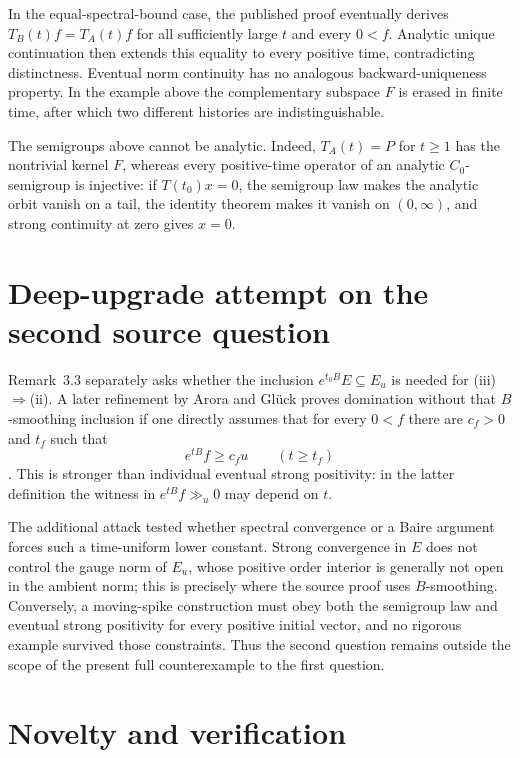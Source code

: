 \documentclass[11pt]{article}
\begin{document}
In the equal-spectral-bound case, the published proof eventually derives
$T_B(t)f=T_A(t)f$ for all sufficiently large $t$ and every $0<f$.  Analytic
unique continuation then extends this equality to every positive time,
contradicting distinctness.  Eventual norm continuity has no analogous
backward-uniqueness property.  In the example above the complementary
subspace $F$ is erased in finite time, after which two different histories
are indistinguishable.

The semigroups above cannot be analytic.  Indeed, $T_A(t)=P$ for $t\geq1$ has
the nontrivial kernel $F$, whereas every positive-time operator of an analytic
$C_0$-semigroup is injective: if $T(t_0)x=0$, the semigroup law makes the
analytic orbit vanish on a tail, the identity theorem makes it vanish on
$(0,\infty)$, and strong continuity at zero gives $x=0$.

\section{Deep-upgrade attempt on the second source question}

Remark~3.3 separately asks whether the inclusion $e^{t_0B}E\subseteq E_u$ is
needed for \textup{(iii)}$\Rightarrow$\textup{(ii)}.  A later refinement by
Arora and Gl\"uck proves domination without that $B$-smoothing inclusion if
one directly assumes that for every $0<f$ there are $c_f>0$ and $t_f$ such
that
\[
 e^{tB}f\geq c_f u\qquad(t\geq t_f)
\]
\cite[Proposition~4.2]{AroraGlueck2023}.  This is stronger than individual
eventual strong positivity: in the latter definition the witness in
$e^{tB}f\gg_u0$ may depend on $t$.

The additional attack tested whether spectral convergence or a Baire
argument forces such a time-uniform lower constant.  Strong convergence in
$E$ does not control the gauge norm of $E_u$, whose positive order interior
is generally not open in the ambient norm; this is precisely where the source
proof uses $B$-smoothing.  Conversely, a moving-spike construction must obey
both the semigroup law and eventual strong positivity for every positive
initial vector, and no rigorous example survived those constraints.  Thus the
second question remains outside the scope of the present full counterexample
to the first question.

\section{Novelty and verification}
\end{document}
